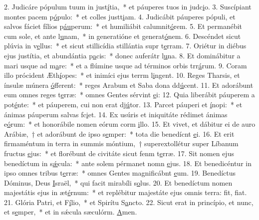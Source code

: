 2. Judicáre pópulum tuum in just\uline{í}tia,~* et páuperes tuos in judc\uline{i}o.
3. Suscípiant montes pacem p\uline{ó}pulo:~* et colles justt\uline{i}am.
4. Judicábit páuperes pópuli, et salvos fáciet fílios p\uline{áu}perum:~* et humiliábit calumnit\uline{ó}rem.
5. Et permanébit cum sole, et ante l\uline{u}nam,~* in generatióne et generat\uline{ó}nem.
6. Descéndet sicut plúvia in v\uline{e}llus:~* et sicut stillicídia stillántia supr t\uline{e}rram.
7. Oriétur in diébus ejus justítia, et abundántia p\uline{a}cis:~* donec auferátr l\uline{u}na.
8. Et dominábitur a mari usque ad m\uline{a}re:~* et a flúmine usque ad términos orbis trr\uline{á}rum.
9. Coram illo prócident Æth\uline{í}opes:~* et inimíci ejus terrm l\uline{i}ngent.
10. Reges Tharsis, et ínsulæ múnera \uline{ó}fferent:~* reges Arabum et Saba dona dd\uline{ú}cent.
11. Et adorábunt eum omnes reges t\uline{e}rræ:~* omnes Gentes sérvint \uline{e}i:
12. Quia liberábit páuperem a pot\uline{é}nte:~* et páuperem, cui non erat dj\uline{ú}tor.
13. Parcet páuperi et \uline{í}nopi:~* et ánimas páuperum salvas fc\uline{i}et.
14. Ex usúris et iniquitáte rédimet ánimas e\uline{ó}rum:~* et honorábile nomen eórum corm \uline{i}llo.
15. Et vivet, et dábitur ei de auro Arábiæ,~† et adorábunt de ipso s\uline{e}mper:~* tota die benedícnt \uline{e}i.
16. Et erit firmaméntum in terra in summis móntium,~† superextollétur super Líbanum fructus \uline{e}jus:~* et florébunt de civitáte sicut fenm t\uline{e}rræ.
17. Sit nomen ejus benedíctum in s\uline{ǽ}cula:~* ante solem pérmanet nomn \uline{e}jus.
18. Et benedicéntur in ipso omnes tribus t\uline{e}rræ:~* omnes Gentes magnificábnt \uline{e}um.
19. Benedíctus Dóminus, Deus \uline{I}sraël,~* qui facit mirabíli s\uline{o}lus.
20. Et benedíctum nomen majestátis ejus in æt\uline{é}rnum:~* et replébitur majestáte ejus omnis terra: fit, f\uline{i}at.
21. Glória Patri, et F\uline{í}lio,~* et Spirítu S\uline{a}ncto.
22. Sicut erat in princípio, et nunc, et s\uline{e}mper,~* et in sǽcula sæculórm. \uline{A}men.
